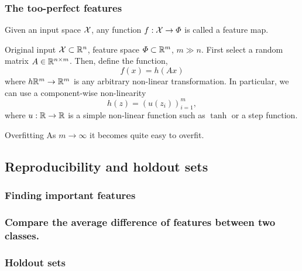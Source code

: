 \begin{frame}
  \frametitle{The too-perfect features}
  \begin{definition}
    Given an input space ${\mathcal{X}}$, any function $f : {\mathcal{X}} \to \Phi$ is called a feature map.
  \end{definition}

  \begin{example}
    Original input ${\mathcal{X}} \subset {\mathbb{R}}^n$, feature space $\Phi \subset {\mathbb{R}}^m$, $m \gg n$. First select a random matrix $A \in {\mathbb{R}}^{n \times m}$. Then, define the function,
    \[
    f(x) = h(Ax)
    \]
    where $h {\mathbb{R}}^m \to {\mathbb{R}}^m$ is any arbitrary non-linear transformation. In particular, we can use a component-wise non-linearity
    \[
    h(z) = \left(u(z_i)\right)_{i=1}^m,
    \]
    where $u : {\mathbb{R}} \to {\mathbb{R}}$ is a simple non-linear function such as $\tanh$ or a step function. 
  \end{example}
  \begin{alertblock}{Overfitting}
    As $m \to \infty$ it becomes quite easy to overfit.
  \end{alertblock}
\end{frame}

\subsection{Reproducibility and holdout sets}
\begin{frame}
  \frametitle{Finding important features}
\end{frame}

\begin{frame}
  \frametitle{Compare the average difference of features between two classes.}
\end{frame}

\begin{frame}
  \frametitle{Holdout sets}
\end{frame}

